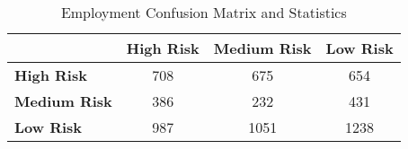 \begin{table}[!htbp]
    \small
    \centering
    \caption{Employment Confusion Matrix and Statistics}
    \label{tab:emp_confusion}
    \begin{tabular}{lccc}
        \toprule
        & \textbf{High Risk} & \textbf{Medium Risk} & \textbf{Low Risk} \\
        \midrule
        \textbf{High Risk} & 708 & 675 & 654 \\
        \textbf{Medium Risk} & 386 & 232 & 431 \\
        \textbf{Low Risk} & 987 & 1051 & 1238 \\
        \bottomrule
    \end{tabular}
\end{table}